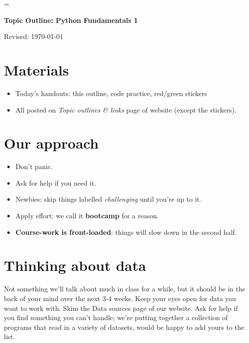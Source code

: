 


\pagestyle{headandfoot}
\runningheadrule
\firstpageheadrule
{}
\runningheader{}{}{}
\runningfooter{}{}{}


\parskip=\bigskipamount

\bigskip\bigskip
\centerline{\Large \bf Topic Outline:  Python Fundamentals 1}
\medskip
\centerline{Revised: \today}


\section*{Materials}

\begin{itemize}
\item  Today's handouts:  this outline, code practice, red/green stickers
\item  All posted on {\it Topic outlines \& links\/} page of website (except the stickers).
\end{itemize}


\section*{Our approach}

\begin{itemize}
\item Don't panic.
\item Ask for help if you need it.
\item Newbies:  skip things labelled {\it challenging\/} until you're up to it.
\item Apply effort: we call it {\bf bootcamp} for a reason.
\item {\bf Course-work is front-loaded}:  things will slow down in the second half.
\end{itemize}


\section*{Thinking about data}

Not something we'll talk about much in class for a while, but it should be in the back of
your mind over the next 3-4 weeks.  Keep your eyes open for data you want to work with.
Skim the Data sources page of our website.
Ask for help if you find something you can't handle; we're putting together
a collection of programs that read in a variety of datasets, would be happy to add yours
to the list.


